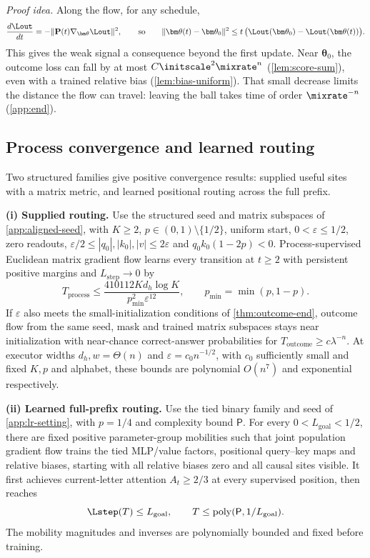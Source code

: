 \emph{Proof idea.} Along the flow, for any schedule,
\[
 \frac{d\Lout}{dt}=-\|\mathbf P(t)\nabla_{\bm\theta}\Lout\|^2,
 \qquad\text{so}\qquad
 \|\bm\theta(t)-\bm\theta_0\|^2\le t\,\bigl(\Lout(\bm\theta_0)-\Lout(\bm\theta(t))\bigr).
\]
This gives the weak signal a consequence beyond the first update. Near $\bm\theta_0$, the outcome loss can fall by at most
$C\initscale^2\mixrate^n$ (\cref{lem:score-sum}), even with a trained relative bias (\cref{lem:bias-uniform}). That small decrease limits
the distance the flow can travel: leaving the ball takes time of order $\mixrate^{-n}$ (\cref{app:end}).

\subsection{Process convergence and learned routing}
\label{sec:aligned-transformer}
Two structured families give positive convergence results: supplied useful sites
with a matrix metric, and learned positional routing across the full prefix.
\begin{theorem}
\label{thm:aligned-transformer}
\textbf{(i) Supplied routing.} Use the structured seed and matrix subspaces of \cref{app:aligned-seed}, with
$K\ge2$, $p\in(0,1)\setminus\{1/2\}$, uniform start, $0<\varepsilon\le1/2$,
zero readouts, $\varepsilon/2\le|q_0|,|k_0|,|v|\le2\varepsilon$ and
$q_0k_0(1-2p)<0$. Process-supervised Euclidean matrix gradient flow learns
every transition at $t\ge2$ with persistent positive margins and
$L_{\mathrm{step}}\to0$ by
\[
 T_{\mathrm{process}}\le
 \frac{410112K d_h\log K}{p_{\min}^2\varepsilon^{12}},
 \qquad p_{\min}=\min(p,1-p).
\]
If $\varepsilon$ also meets the small-initialization conditions of
\cref{thm:outcome-end}, outcome flow from the same seed, mask and trained
matrix subspaces stays near initialization with near-chance correct-answer
probabilities for $T_{\mathrm{outcome}}\ge c\lambda^{-n}$.
At executor widths $d_h,w=\Theta(n)$ and $\varepsilon=c_0n^{-1/2}$, with $c_0$
sufficiently small and fixed $K,p$ and alphabet, these bounds are polynomial $O(n^7)$
and exponential respectively.

\textbf{(ii) Learned full-prefix routing.} Use the tied binary family and seed of
\cref{app:lr-setting}, with $p=1/4$ and complexity bound $\mathsf P$.
For every $0<L_{\mathrm{goal}}<1/2$, there are fixed positive parameter-group
mobilities such that joint population gradient flow trains the tied MLP/value
factors, positional query--key maps and relative biases, starting with all relative
biases zero and all causal sites visible. It first achieves current-letter
attention $A_t\ge2/3$ at every supervised position, then reaches
\[
 \Lstep(T)\le L_{\mathrm{goal}},\qquad
 T\le\operatorname{poly}(\mathsf P,1/L_{\mathrm{goal}}).
\]
The mobility magnitudes and inverses are polynomially bounded and fixed before training.
\end{theorem}
